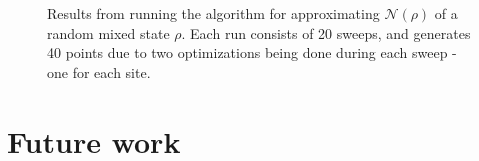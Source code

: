 \documentclass{article}
\begin{document}
\begin{figure}[H]
\centering
{}
\caption{Results from running the algorithm for approximating $\mathcal N(\rho)$ of a random mixed state $\rho$. Each run consists of 20 sweeps, and generates 40 points due to two optimizations being done during each sweep - one for each site.}
\end{figure}

\section{Future work}
\end{document}
